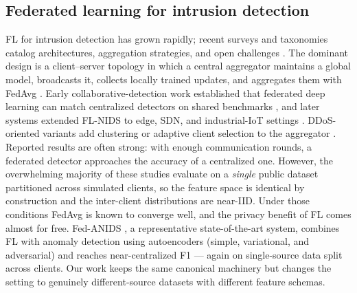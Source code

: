 \documentclass[11pt,a4paper]{article}
\begin{document}
\subsection{Federated learning for intrusion detection}
FL for intrusion detection has grown rapidly; recent surveys and taxonomies
catalog architectures, aggregation strategies, and open challenges
\cite{ref-fl-survey,ref-fl-review,wardana-survey,fedorchenko}. The dominant design
is a client--server topology in which a central aggregator maintains a global
model, broadcasts it, collects locally trained updates, and aggregates them with
FedAvg \cite{mcmahan}. Early collaborative-detection work established that
federated deep learning can match centralized detectors on shared benchmarks
\cite{popoola,agrawal}, and later systems extended FL-NIDS to edge, SDN, and
industrial-IoT settings \cite{chen-fedagru,doriguzzi-eff,mao-fedin}. DDoS-oriented
variants add clustering or adaptive client selection to the aggregator
\cite{lee-feddb,zainudin-fedddos,doriguzzi-flad}. Reported results are often
strong: with enough communication rounds, a federated detector approaches the
accuracy of a centralized one. However, the overwhelming
majority of these studies evaluate on a \emph{single} public dataset partitioned
across simulated clients, so the feature space is identical by construction and
the inter-client distributions are near-IID. Under those conditions FedAvg is
known to converge well, and the privacy benefit of FL comes almost for free.
Fed-ANIDS \cite{fedanids}, a representative state-of-the-art system, combines FL
with anomaly detection using autoencoders (simple, variational, and adversarial)
and reaches near-centralized F1 --- again on single-source data split across
clients. Our work keeps the same canonical machinery but changes the setting to
genuinely different-source datasets with different feature schemas.
\end{document}
